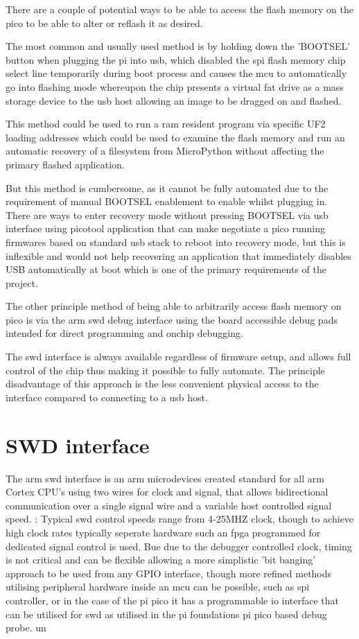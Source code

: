 There are a couple of potential ways to be able to access the flash memory on the pico to be able to alter or reflash it as desired.

The most common and usually used method is by holding down the 'BOOTSEL' button when plugging the pi into \gls{usb}, which disabled the \gls{spi} flash memory chip select line temporarily during boot process and causes the \gls{mcu} to automatically go into flashing mode whereupon the chip presents a virtual fat drive as a mass storage device to the \gls{usb} host allowing an image to be dragged on and flashed.

This method could be used to run a \gls{ram} resident program via specific UF2 loading addresses which could be used to examine the flash memory and run an automatic recovery of a filesystem from MicroPython without affecting the primary flashed application.

But this method is cumbersome, as it cannot be fully automated due to the requirement of manual BOOTSEL enablement to enable whilst plugging in. There are ways to enter recovery mode without pressing BOOTSEL via \gls{usb} interface using picotool application that can make negotiate a pico running firmwares based on standard \gls{usb} stack to reboot into recovery mode\cite{picotool}, but this is inflexible and would not help recovering an application that immediately disables USB automatically at boot which is one of the primary requirements of the project.

The other principle method of being able to arbitrarily access flash memory on pico is via the \gls{arm} \gls{swd} debug interface using the board accessible debug pads intended for direct programming and onchip debugging\cite{ARMDebugInterface}.

The \gls{swd} interface  is always available regardless of firmware setup, and allows full control of the chip thus making it possible to fully automate. The principle disadvantage of this approach is the less convenient physical access to the interface compared to connecting to a \gls{usb} host.
\clearpage
\section{SWD interface}
The \gls{arm} \gls{swd} interface is an \gls{arm} microdevices created standard for all \gls{arm} Cortex CPU's using two wires for clock and signal, that allows bidirectional communication over a single signal wire and a variable host controlled signal speed.
:
Typical \gls{swd} control speeds range from 4-25MHZ clock, though to achieve high clock rates typically seperate hardware such an \gls{fpga} programmed for dedicated signal control is used. Bue due to the debugger controlled clock, timing is not critical and can be flexible allowing a more simplistic 'bit banging' approach to be used from any GPIO interface, though more refined methods utilising peripheral hardware inside an \gls{mcu} can be possible, such as \gls{spi} controller, or in the case of the pi pico it has a programmable io interface that can be utilised for \gls{swd} as utilised in the pi foundations pi pico based debug probe. un

